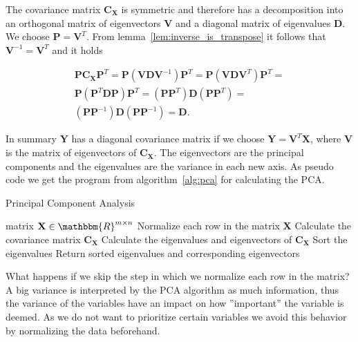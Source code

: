 The covariance matrix $\mathbf{C}_\mathbf{X}$ is symmetric and therefore has a decomposition into an orthogonal matrix of eigenvectors $\mathbf{V}$ and a diagonal matrix of eigenvalues $\mathbf{D}$. We choose $\mathbf{P}=\mathbf{V}^T$. From lemma~\ref{lem:inverse_is_transpose} it follows that $\mathbf{V}^{-1} = \mathbf{V}^T$ \color{change} and it holds \color{black}

\begin{align*}
	\mathbf{P}\mathbf{C}_\mathbf{X}\mathbf{P}^T = \mathbf{P}(\mathbf{VDV}^{-1})\mathbf{P}^T = \mathbf{P}(\mathbf{VDV}^{T})\mathbf{P}^T =\\
	\mathbf{P}(\mathbf{P}^T\mathbf{DP})\mathbf{P}^T = (\mathbf{P}\mathbf{P}^T)\mathbf{D}(\mathbf{P}\mathbf{P}^T) =\\
	(\mathbf{P}\mathbf{P}^{-1})\mathbf{D}(\mathbf{P}\mathbf{P}^{-1}) = \mathbf{D}.
\end{align*}

In summary $\mathbf{Y}$ has a diagonal covariance matrix if we choose $\mathbf{Y} = \mathbf{V}^T\mathbf{X}$, where $\mathbf{V}$ is the matrix of eigenvectors of $\mathbf{C}_\mathbf{X}$. The eigenvectors are the principal components and the eigenvalues are the variance in each new axis.
As pseudo code we get the program from algorithm~\ref{alg:pca} for calculating the PCA.

\begin{algorithm}
	\caption{Principal Component Analysis}\label{alg:pca}
	\begin{algorithmic}
		\Require matrix $\mathbf{X} \in \mathbbm{R}^{m\times n}$
		\State Normalize each row in the matrix $\mathbf{X}$
		\State Calculate the covariance matrix $\mathbf{C_{X}}$
		\State Calculate the eigenvalues and eigenvectors of $\mathbf{C_{X}}$
		\State Sort the eigenvalues
		\State Return sorted eigenvalues and corresponding eigenvectors
	\end{algorithmic}
\end{algorithm}

What happens if we skip the step in which we normalize each row in the matrix? A big variance is interpreted by the PCA algorithm as much information, thus the variance of the variables have an impact on how ''important'' the variable is deemed. As we do not want to prioritize certain variables we avoid this behavior by normalizing the data beforehand.